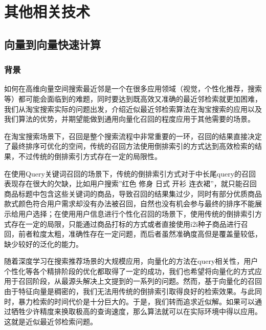 \chapter{ 其他相关技术 }

\thispagestyle{empty}


\setlength{\fboxrule}{0pt}\setlength{\fboxsep}{0cm}
\noindent\shadowbox{
\begin{tcolorbox}[arc=0mm,colback=lightblue,colframe=darkblue,title=学习目标与要求]

\end{tcolorbox}}
\setlength{\fboxrule}{1pt}\setlength{\fboxsep}{4pt} 
\section{向量到向量快速计算}
\subsection{背景}
如何在高维向量空间搜索最近邻是一个在很多应用领域（视觉，个性化推荐，搜索等）都可能会面临到的难题，同时要达到既高效又准确的最近邻检索就更加困难，我们从淘宝搜索实际的问题出发，介绍近似最近邻检索算法在淘宝搜索的应用以及我们算法的优势，并期望能做到通用向量化召回的程度应用于其他需要的场景。

\par 在淘宝搜索场景下，召回是整个搜索流程中非常重要的一环，召回的结果直接决定了最终排序可优化的空间，传统的召回方法使用倒排索引的方式达到高效检索的结果，不过传统的倒排索引方式存在一定的局限性。
\par 在使用Query关键词召回的场景下，传统的倒排索引方式对于中长尾query的召回表现存在很大的欠缺，比如用户搜索”红色 修身  日式 开衫 连衣裙”，就只能召回商品标题中包含这些关键词的商品，导致召回的结果集过少，同时有部分优质商品款式颜色符合用户需求却没有办法被召回，自然也没有机会参与最终的排序不能展示给用户选择；在使用用户信息进行个性化召回的场景下，使用传统的倒排索引方式存在一定的局限，只能通过商品打标的方式或者直接使用i2i种子商品进行召回，前者粒度太粗，准确性存在一定问题，而后者虽然准确度高但是覆盖量较低，缺少较好的泛化的能力。
\par 随着深度学习在搜索推荐场景的大规模应用，向量化的方法在query相关性，用户个性化等各个精排阶段的优化都取得了一定的成功，我们也希望将向量化的方式应用于召回阶段，从最源头解决上文提到的一系列的问题。然而，基于向量化的召回由于特征向量是稠密的，我们无法用传统的倒排索引取得良好的检索效果。与此同时，暴力检索的时间代价是十分巨大的。于是，我们转而追求近似解。如果可以通过牺牲少许精度来换取极高的查询速度，那么算法就可以在实际环境中得以应用。这就是近似最近邻检索问题。
